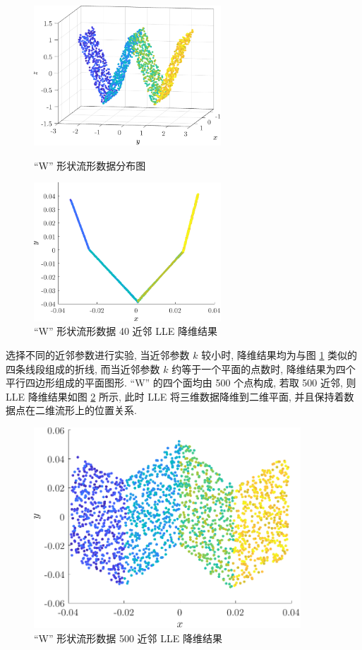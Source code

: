\documentclass[openany]{ctexbook}
\theoremstyle{kaiti}
\theoremstyle{normal}
\begin{document}
\begin{figure}[htbp]
  \centering
  \begin{minipage}[t]{0.48\textwidth}
    \centering
    \includegraphics[width=7cm]{manifoldW.pdf}
    \caption{``W'' 形状流形数据分布图}
    \label{fig:manifoldW}
  \end{minipage}
  \begin{minipage}[t]{0.48\textwidth}
    \centering
    \includegraphics[width=7cm]{reducedW.pdf}
    \caption{``W'' 形状流形数据 40 近邻 LLE 降维结果}
    \label{fig:reducedW}
  \end{minipage}
\end{figure}

选择不同的近邻参数进行实验, 当近邻参数 $k$ 较小时, 降维结果均为与图 \ref{fig:reducedW} 类似的四条线段组成的折线, 而当近邻参数 $k$ 约等于一个平面的点数时, 降维结果为四个平行四边形组成的平面图形. ``W'' 的四个面均由 500 个点构成, 若取 500 近邻, 则 LLE 降维结果如图 \ref{fig:reducedW500} 所示, 此时 LLE 将三维数据降维到二维平面, 并且保持着数据点在二维流形上的位置关系.

\begin{figure}[htbp]
  \centering
  \includegraphics[width=10cm]{reducedW500.pdf}
  \caption{``W'' 形状流形数据 500 近邻 LLE 降维结果}
  \label{fig:reducedW500}
\end{figure}
\end{document}
